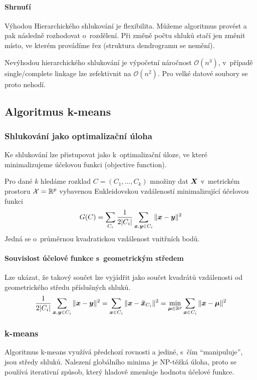 \paragraph{Shrnuťí} Výhodou Hierarchického shlukování je flexibilita. Můžeme algoritmus provést a pak následně rozhodovat o~rozdělení. Při změně počtu shluků stačí jen změnit místo, ve kterém provádíme řez (struktura dendrogramu se nemění).

Nevýhodou hierarchického shlukování je výpočetní náročnost $\mathcal{O}(n^3)$, v~případě single/complete linkage lze zefektivnit na $\mathcal{O}(n^2)$. Pro velké datové soubory se proto nehodí.

\subsection{Algoritmus k-means}

\subsubsection{Shlukování jako optimalizační úloha}

Ke shlukování lze přistupovat jako k~optimalizační úloze, ve které minimalizujeme účelovou funkci (objective function).

Pro dané $k$ hledáme rozklad $C = (C_1, \ldots, C_k)$ množiny dat $\bm{X}$ v~metrickém prostoru $\mathcal{X} = \mathbb{R}^p$ vybavenou Eukleidovskou vzdáleností minimalizující účelovou funkci
\[
    G(C) = \sum_{C_i} \frac{1}{2 |C_i|} \sum_{\bm{x}, \bm{y} \in C_i} \|\bm{x} - \bm{y}\|^2
\]
Jedná se o~průměrnou kvadratickou vzdálenost vnitřních bodů.

\paragraph{Souvislost účelové funkce s~geometrickým středem}
Lze ukázat, že takový součet lze vyjádřit jako součet kvadrátů vzdálenosti od geometrického středu příslušných shluků.
\[
    \frac{1}{2 |C_i|} \sum_{\bm{x}, \bm{y} \in C_i} \|\bm{x} - \bm{y}\|^2
    = \sum_{\bm{x} \in C_i} \|\bm{x} - \bm{\bar{x}}_{C_i}\|^2
    = \min_{\bm{\mu} \in \mathbb{R}^p} \sum_{\bm{x} \in C_i} \|\bm{x} - \bm{\mu}\|^2
\]

\subsubsection{k-means}

Algoritmus k-means využívá předchozí rovnosti a jediné, s~čím ``manipuluje'', jsou středy shluků. Nalezení globálního minima je NP-těžká úloha, proto se používá iterativní způsob, který hladově zmenšuje hodnotu účelové funkce.

